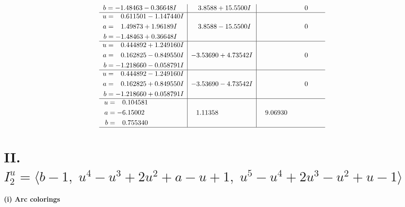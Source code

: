 \documentclass[1p]{elsarticle_modified}
\theoremstyle{definition}
\begin{document}
$$\begin{array}{c|c|c}
\begin{aligned}
b &= -1.48463 - 0.36648 I\end{aligned}
 & \phantom{-}3.8588 + 15.5500 I & \phantom{-0.000000 } 0 \\ \hline\begin{aligned}
u &= \phantom{-}0.611501 - 1.147440 I \\
a &= \phantom{-}1.49873 + 1.96189 I \\
b &= -1.48463 + 0.36648 I\end{aligned}
 & \phantom{-}3.8588 - 15.5500 I & \phantom{-0.000000 } 0 \\ \hline\begin{aligned}
u &= \phantom{-}0.444892 + 1.249160 I \\
a &= \phantom{-}0.162825 - 0.849550 I \\
b &= -1.218660 - 0.058791 I\end{aligned}
 & -3.53690 + 4.73542 I & \phantom{-0.000000 } 0 \\ \hline\begin{aligned}
u &= \phantom{-}0.444892 - 1.249160 I \\
a &= \phantom{-}0.162825 + 0.849550 I \\
b &= -1.218660 + 0.058791 I\end{aligned}
 & -3.53690 - 4.73542 I & \phantom{-0.000000 } 0 \\ \hline\begin{aligned}
u &= \phantom{-}0.104581\phantom{ +0.000000I} \\
a &= -6.15002\phantom{ +0.000000I} \\
b &= \phantom{-}0.755340\phantom{ +0.000000I}\end{aligned}
 & \phantom{-}1.11358\phantom{ +0.000000I} & \phantom{-}9.06930\phantom{ +0.000000I}\\
 \hline 
 \end{array}$$\newpage\newpage\renewcommand{\arraystretch}{1}
\centering \section*{II. $I^u_{2}= \langle b-1,\;u^4- u^3+2 u^2+a- u+1,\;u^5- u^4+2 u^3- u^2+u-1 \rangle$}
\flushleft \textbf{(i) Arc colorings}\\
\end{document}
